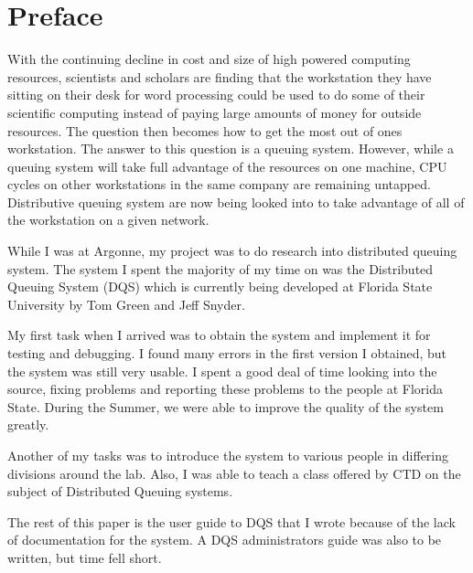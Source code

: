 \section {Preface}

With the continuing decline in cost and size of high powered computing
resources, scientists and scholars are finding that the workstation they
have sitting on their desk for word processing could be used to do some of
their scientific computing instead of paying large amounts of money for
outside resources.  The question then becomes how to get the most out of
ones workstation.  The answer to this question is a queuing system.
However, while a queuing system will take full advantage of the resources
on one machine, CPU cycles on other workstations in the same company are
remaining untapped.  Distributive queuing system are now being looked into
to take advantage of all of the workstation on a given network.

While I was at Argonne, my project was to do research into distributed
queuing system.  The system I spent the majority of my time on was the
Distributed Queuing System (DQS) which is currently being developed at
Florida State University by Tom Green and Jeff Snyder.

My first task when I arrived was to obtain the system and implement it for
testing and debugging.  I found many errors in the first version I
obtained, but the system was still very usable.  I spent a good deal of
time looking into the source, fixing problems and reporting these problems
to the people at Florida State.  During the Summer, we were able to improve
the quality of the system greatly.  

Another of my tasks was to introduce the system to various people in
differing divisions around the lab.  Also, I was able to teach a class
offered by CTD on the subject of Distributed Queuing systems.

The rest of this paper is the user guide to DQS that I wrote because of the
lack of documentation for the system.  A DQS administrators guide was also
to be written, but time fell short.
